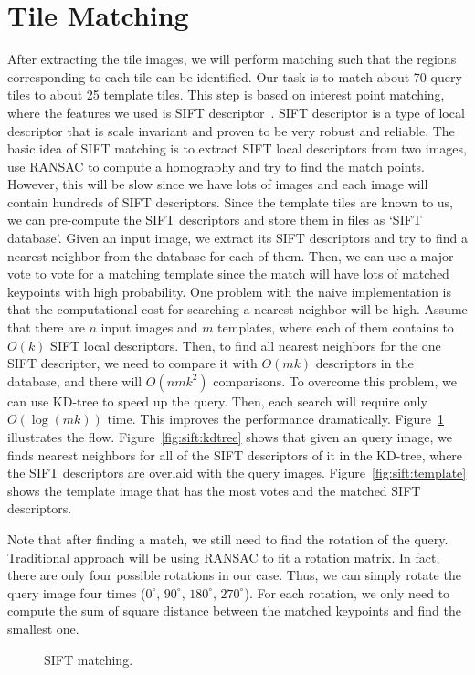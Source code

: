 \section{Tile Matching}
\label{sec:matching}
After extracting the tile images, we will perform matching such that the regions
corresponding to each tile can be identified. Our task is to match about 70 query
tiles to about 25 template tiles. This step is based on interest point matching,
where the features we used is SIFT descriptor~\cite{lowe1999object}. SIFT
descriptor is a type of local descriptor that is scale invariant and proven to be
very robust and reliable. The basic idea of SIFT matching is to extract SIFT
local descriptors from two images, use RANSAC to compute a homography and try to
find the match points. However, this will be slow since we have lots of images
and each image will contain hundreds of SIFT descriptors. Since the template
tiles are known to us, we can pre-compute the SIFT descriptors and store them in
files as `SIFT database'. Given an input image, we extract its SIFT descriptors
and try to find a nearest neighbor from the database for each of them. Then, we
can use a major vote to vote for a matching template since the match will have
lots of matched keypoints with high probability. One problem with the naive
implementation is that the computational cost for searching a nearest neighbor
will be high. Assume that there are $n$ input images and $m$ templates, where
each of them contains to $O(k)$ SIFT local descriptors. Then, to find all nearest
neighbors for the one SIFT descriptor, we need to compare it with $O(mk)$
descriptors in the database, and there will $O(nmk^2)$ comparisons. To overcome
this problem, we can use KD-tree to speed up the query. Then, each search will
require only $O(\log (mk))$ time. This improves the performance dramatically.
Figure~\ref{fig:sift} illustrates the flow.
Figure~\ref{fig:sift:kdtree} shows that given an query image,
we finds nearest neighbors for all of the SIFT descriptors of it
in the KD-tree, where the SIFT descriptors are overlaid with the query
images. Figure~\ref{fig:sift:template} shows the template image 
that has the most votes and the matched SIFT descriptors.

Note that after finding a match, we still need to find the rotation of the query.
Traditional approach will be using RANSAC to fit a rotation matrix. In fact,
there are only four possible rotations in our case. Thus, we can simply rotate
the query image four times ($0^\circ$, $90^\circ$, $180^\circ$, $270^\circ$).
For each rotation, we only need to compute the sum of square distance between
the matched keypoints and find the smallest one. 

\begin{figure}[b]
\centering
{}
\hfill
{}
\caption{SIFT matching.}
\label{fig:sift}
\end{figure}